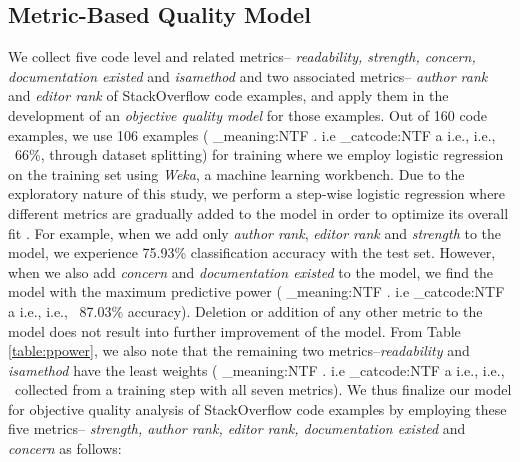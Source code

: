 \documentclass[conference]{IEEEtran}
\makeatletter
\newcommand\latinabbrev[1]{
  \peek_meaning:NTF . {%
    #1\@}%
  { \peek_catcode:NTF a {%
      #1., \@ }%
    {#1., \@}}}
\def\ie{\latinabbrev{i.e}}
\makeatother
\begin{document}
\subsection{Metric-Based Quality Model}
We collect five code level and related metrics-- \emph{readability, strength, concern, documentation existed} and \emph{isamethod} and two associated metrics-- \emph{author rank} and \emph{editor rank} of StackOverflow code examples, and apply them in the development of an \emph{objective quality model} for those examples. Out of 160 code examples, we use 106 examples (\ie\ 66\%, through dataset splitting) for training where we employ logistic regression on the training set using \emph{Weka}, a machine learning workbench. Due to the exploratory nature of this study, we perform a step-wise logistic regression where 
different metrics are gradually added to the model in order to optimize its overall fit \cite{kevic}. For example, when we add only \emph{author rank}, \emph{editor rank} and \emph{strength} to the model, we experience 75.93\% classification accuracy with the test set. However, when we also add \emph{concern} and \emph{documentation existed} to the model, we find the model with the maximum predictive power (\ie\ 87.03\% accuracy). Deletion or addition of any other metric to the model does not result into further improvement of the model.
From Table \ref{table:ppower}, we also note that the remaining two metrics--\emph{readability} and \emph{isamethod} have the least weights (\ie\ collected from a training step with all seven metrics).
We thus finalize our model for objective quality analysis of StackOverflow code examples by employing these five metrics-- \emph{strength, author rank, editor rank, documentation existed} and \emph{concern} as follows:
\end{document}
